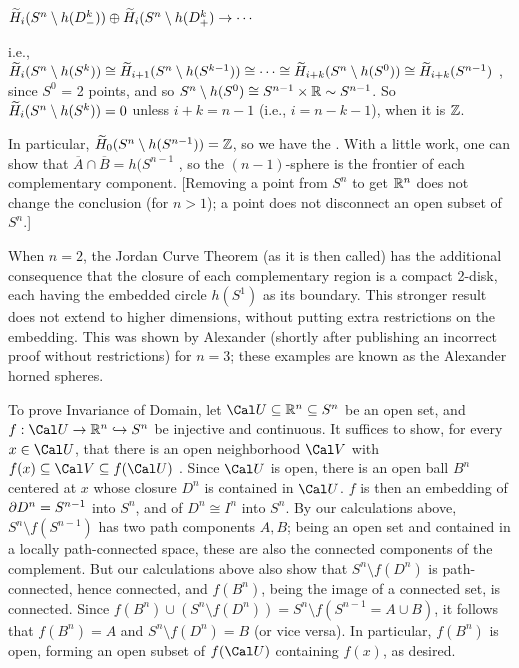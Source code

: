 \hfill $\widetilde{H}_{i}(S^n\setminus h(D^k_-))\oplus \widetilde{H}_{i}(S^n\setminus h(D^k_+)\rightarrow \cdots $

i.e., $\widetilde{H}_{i}(S^n\setminus h(S^k)) \cong \widetilde{H}_{i+1}(S^n\setminus h(S^{k-1})) 
\cong \cdots \cong \widetilde{H}_{i+k}(S^n\setminus h(S^0))\cong \widetilde{H}_{i+k}(S^{n-1})$ ,
since $S^0$ = 2 points, and  so $S^n\setminus h(S^0)\cong S^{n-1}\times {\Bbb R} \sim S^{n-1}$.
So $\widetilde{H}_{i}(S^n\setminus h(S^k)) = 0$ unless $i+k=n-1$ (i.e., $i=n-k-1$), when it is ${\Bbb Z}$.

\ssk

In particular, $\widetilde{H}_0(S^n\setminus h(S^{n-1}))={\Bbb Z}$, so 
we have the  . With a little work, one can show that
$\overline{A}\cap \overline{B} = h(S^{n-1}$ , so the $(n-1)$-sphere is the frontier of each
complementary component. [Removing a point from $S^n$ to get ${\Bbb R}^n$ does not change the
conclusion (for $n>1$); a point does not disconnect an open subset of $S^n$.]

\msk

When $n=2$, the Jordan Curve Theorem (as it is then called) has the additional
consequence that the closure of each complementary region is a compact 2-disk,
each having the embedded circle $h(S^1)$ as its boundary. This stronger result
does not extend to higher dimensions, without putting extra restrictions 
on the embedding. This was shown by Alexander (shortly after publishing an
incorrect proof without restrictions) for $n=3$; these examples are known as
the Alexander horned spheres.

\msk

To prove Invariance of Domain, let ${\Cal U}\subseteq \bbr^n\subseteq S^n$ be an open 
set, and $f:{\Cal U}\ra \bbr^n \hookrightarrow S^n$ be injective and continuous. It suffices
to show, for every $x\in {\Cal U}$, that there is an open neighborhood ${\Cal V}$ with
$f(x)\subseteq {\Cal V} \subseteq f({\Cal U})$ . Since ${\Cal U}$ is open,
there is an open ball $B^n$ centered at $x$ whose closure $D^n$ is contained in ${\Cal U}$. 
$f$ is then an embedding of $\partial D^n = S^{n-1}$ into $S^n$, and of $D^n\cong I^n$ into $S^n$.
By our calculations above, $S^n\setminus f(S^{n-1})$ has two path components $A,B$; being an open set 
and contained in a locally path-connected space, these are also the connected components
of the complement. But our calculations above also show that $S^n\setminus f(D^n)$ is
path-connected, hence connected, and $f(B^n)$, being the image of a connected set, is connected.
Since $f(B^n)\cup (S^n\setminus f(D^n)) = S^n\setminus f(S^{n-1} = A\cup B)$, it follows that
$f(B^n)=A$ and $S^n\setminus f(D^n) = B$ (or vice versa). In particular,
$f(B^n)$ is open, forming an open subset of $f({\Cal U})$ containing $f(x)$, as desired.

